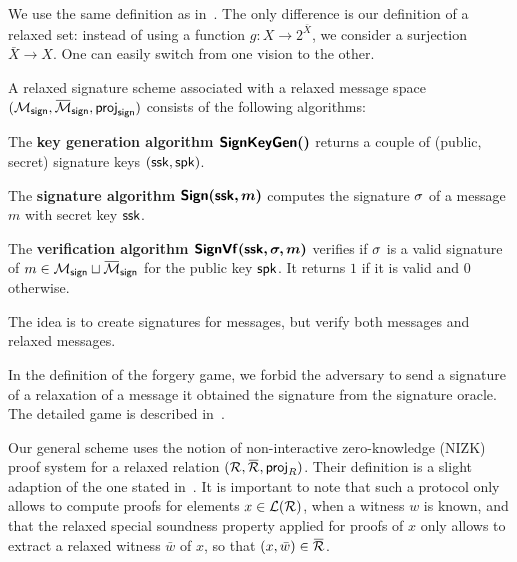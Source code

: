 
\label{sec:relaxed_signature_scheme}
	We use the same definition as in~\cite[Section 5.1]{ISC:BosCamNev18}. The 
only difference is our definition of a relaxed set: instead of using 
a function $g: X \rightarrow 2^{\bar{X}}$, we consider a surjection $\bar{X} 
\rightarrow X$. One can easily switch from one vision to the other.

A relaxed signature scheme  associated with a relaxed message 
space $(\SetMessSign,\SetRelMessSign, \projsign)$ consists of 
the following algorithms:


\begin{compactitem}
	\item The \textbf{key generation algorithm $\bm{\mathsf{SignKeyGen}()}$} returns a 
couple of (public, secret) signature keys $(\mathsf{ssk}, \mathsf{spk})$.
	\item The \textbf{signature algorithm $\bm{\mathsf{Sign}(\mathsf{ssk}, m)}$} computes the 
signature $\sigma$ of a	message $m$ with secret key $\mathsf{ssk}$.
	\item The \textbf{verification algorithm $\bm{\mathsf{SignVf}(\mathsf{ssk}, \sigma, 
m)}$} verifies if $\sigma$ is a valid signature of $m \in \SetMessSign 
\sqcup \SetRelMessSign$ for the public key $\mathsf{spk}$. It returns $1$ if it is 
valid and $0$ otherwise.
\end{compactitem}

The idea is to create signatures for messages, but verify both messages and 
relaxed messages.
	 
In the definition of the forgery game, we forbid the adversary to send a 
signature of a relaxation of a message it obtained the signature from the signature oracle. The 
detailed game is described in~\cite[Section 5.1]{ISC:BosCamNev18}.


	Our general scheme uses the notion of non-interactive zero-knowledge 
(NIZK) proof system for a relaxed relation $(\relation,\barrelation, \proj_R)$.
Their definition is a slight adaption 
 of the one stated in~\cite[Section 3.1]{ISC:BosCamNev18}. It is 
important to note that such a protocol
only allows to compute proofs for elements $x \in \mathcal{L}(\mathcal{R})$, 
when a witness $w$ is known,
 and that the relaxed special soundness property applied for proofs of 
$x$ only allows to extract a
 relaxed witness $\bar{w}$ of $x$, so that $(x, \bar{w}) \in 
\barrelation$.

